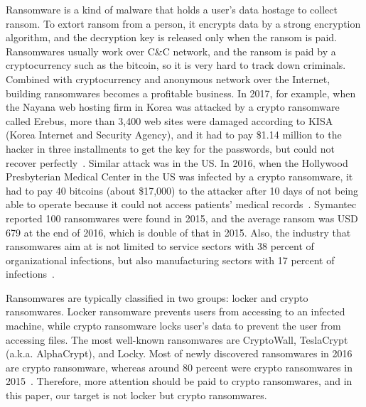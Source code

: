 \documentclass[conference]{IEEEtran}
\begin{document}
Ransomware is a kind of malware that holds a user's data hostage to
collect ransom.  To extort ransom from a person, it encrypts data
by a strong encryption algorithm, and the decryption key is
released only when the ransom is paid.  Ransomwares usually work
over C\&C network, and the ransom is paid by a cryptocurrency such
as the bitcoin, so it is very hard to track down criminals.
Combined with cryptocurrency and anonymous network over the
Internet, building ransomwares becomes a profitable business.  In
2017, for example, when the Nayana web hosting firm in Korea was
attacked by a crypto ransomware called Erebus, more than 3,400 web
sites were damaged according to KISA (Korea Internet and Security
Agency), and it had to pay  \$1.14 million to the hacker in three
installments to get the key for the passwords, but could not
recover perfectly~\cite{zdnet}.  Similar attack was in the US. In
2016, when the Hollywood Presbyterian Medical Center in the US was
infected by a crypto ransomware, it had to pay 40 bitcoins (about
\$17,000) to the attacker after 10 days of not being able to
operate because it could not access patients’ medical
records~\cite{everette16}.  Symantec reported 100 ransomwares were
found in 2015, and the average ransom was USD 679 at the end of
2016, which is double of that in 2015.  Also, the industry that
ransomwares aim at is not limited to service sectors with 38
percent of organizational infections, but also manufacturing
sectors with 17 percent of infections~\cite{symantec16}.

Ransomwares are typically classified in two groups: locker and
crypto ransomwares.  Locker ransomware prevents users from
accessing to an infected machine, while crypto ransomware locks
user's data to prevent the user from accessing files.  The most
well-known ransomwares are CryptoWall, TeslaCrypt (a.k.a.
AlphaCrypt), and Locky.  Most of newly discovered ransomwares in
2016 are crypto ransomware, whereas around 80 percent were crypto
ransomwares in 2015~\cite{symantec16}.  Therefore, more attention
should be paid to crypto ransomwares, and in this paper, our target
is not locker but crypto ransomwares.
\end{document}
